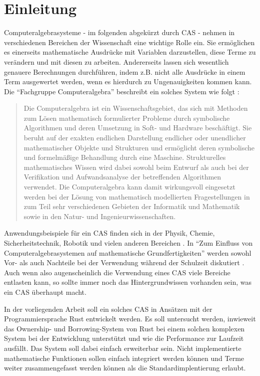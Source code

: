 \documentclass[11pt,a4paper, ngerman]{article}
\begin{document}
\section{Einleitung}
Computeralgebrasysteme - im folgenden abgekürzt durch CAS - nehmen in verschiedenen Bereichen der Wissenschaft eine wichtige Rolle ein. Sie ermöglichen es einerseits mathematische Ausdrücke mit Variablen darzustellen, diese Terme zu verändern und mit diesen zu arbeiten. Andererseits lassen sich wesentlich genauere Berechnungen durchführen, indem z.B. nicht alle Ausdrücke in einem Term ausgewertet werden, wenn es hierdurch zu Ungenauigkeiten kommen kann. Die ``Fachgruppe Computeralgebra'' beschreibt ein solches System wie folgt \cite{FachgruppeDef}:
\begin{quote}
    Die Computeralgebra ist ein Wissenschaftsgebiet, das sich mit Methoden zum Lösen mathematisch formulierter Probleme durch symbolische Algorithmen und deren Umsetzung in Soft- und Hardware beschäftigt. Sie beruht auf der exakten endlichen Darstellung endlicher oder unendlicher mathematischer Objekte und Strukturen und ermöglicht deren symbolische und formelmäßige Behandlung durch eine Maschine. Strukturelles mathematisches Wissen wird dabei sowohl beim Entwurf als auch bei der Verifikation und Aufwandsanalyse der betreffenden Algorithmen verwendet. Die Computeralgebra kann damit wirkungsvoll eingesetzt werden bei der Lösung von mathematisch modellierten Fragestellungen in zum Teil sehr verschiedenen Gebieten der Informatik und Mathematik sowie in den Natur- und Ingenieurwissenschaften.
\end{quote}

Anwendungsbeispiele für ein CAS finden sich in der Physik, Chemie, Sicherheitstechnik, Robotik und vielen anderen Bereichen \cite{FachgruppeEinsatz}. In ``Zum Einfluss von Computeralgebrasystemen auf mathematische Grundfertigkeiten'' werden sowohl Vor- als auch Nachteile bei der Verwendung während der Schulzeit diskutiert \cite[S. 17 ff.]{RN18}. Auch wenn also augenscheinlich die Verwendung eines CAS viele Bereiche entlasten kann, so sollte immer noch das Hintergrundwissen vorhanden sein, was ein CAS überhaupt macht.

In der vorliegenden Arbeit soll ein solches CAS in Ansätzen mit der Programmiersprache Rust entwickelt werden. Es soll untersucht werden, inwieweit das Ownership- und Borrowing-System von Rust bei einem solchen komplexen System bei der Entwicklung unterstützt und wie die Performance zur Laufzeit ausfällt. Das System soll dabei einfach erweiterbar sein. Nicht implementierte mathematische Funktionen sollen einfach integriert werden können und Terme weiter zusammengefasst werden können als die Standardimplentierung erlaubt.
\end{document}
